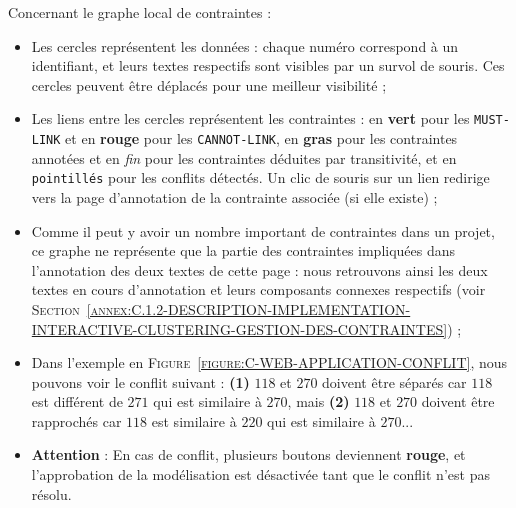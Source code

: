 		Concernant le graphe local de contraintes :
		\begin{itemize}
			\item Les cercles représentent les données : chaque numéro correspond à un identifiant, et leurs textes respectifs sont visibles par un survol de souris.
			Ces cercles peuvent être déplacés pour une meilleur visibilité ;
			\item Les liens entre les cercles représentent les contraintes : en \textcolor{colorApplicationMUSTLINK}{\textbf{vert}} pour les \texttt{MUST-LINK} et en \textcolor{colorApplicationCANNOTLINK}{\textbf{rouge}} pour les \texttt{CANNOT-LINK}, en \textbf{gras} pour les contraintes annotées et en \textit{fin} pour les contraintes déduites par transitivité, et en \texttt{pointillés} pour les conflits détectés.
			Un clic de souris sur un lien redirige vers la page d'annotation de la contrainte associée (si elle existe) ;
			\item Comme il peut y avoir un nombre important de contraintes dans un projet, ce graphe ne représente que la partie des contraintes impliquées dans l'annotation des deux textes de cette page : nous retrouvons ainsi les deux textes en cours d'annotation et leurs composants connexes respectifs (voir \textsc{Section~\ref{annex:C.1.2-DESCRIPTION-IMPLEMENTATION-INTERACTIVE-CLUSTERING-GESTION-DES-CONTRAINTES}}) ;
			\item Dans l'exemple en \textsc{Figure~\ref{figure:C-WEB-APPLICATION-CONFLIT}}, nous pouvons voir le conflit suivant : \textbf{(1)} $118$ et $270$ doivent être séparés car $118$ est différent de $271$ qui est similaire à $270$, mais \textbf{(2)} $118$ et $270$ doivent être rapprochés car $118$ est similaire à $220$ qui est similaire à $270$...
			\item \textbf{Attention} : En cas de conflit, plusieurs boutons deviennent \textcolor{colorApplicationERROR}{\textbf{rouge}}, et l'approbation de la modélisation est désactivée tant que le conflit n'est pas résolu.
		\end{itemize}